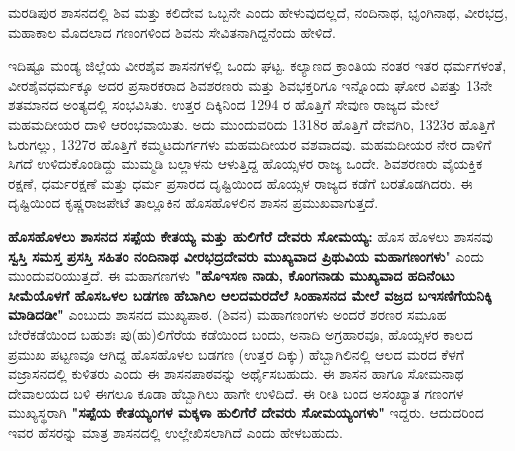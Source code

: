 ಮರಡಿಪುರ ಶಾಸನದಲ್ಲಿ ಶಿವ ಮತ್ತು ಕಲಿದೇವ ಒಬ್ಬನೇ ಎಂದು ಹೇಳುವುದಲ್ಲದೆ, ನಂದಿನಾಥ, ಭೃಂಗಿನಾಥ, ವೀರಭದ್ರ, ಮಹಾಕಾಲ ಮೊದಲಾದ ಗಣಂಗಳಿಂದ ಶಿವನು ಸೇವಿತನಾಗಿದ್ದನೆಂದು ಹೇಳಿದೆ.

ಇದಿಷ್ಟೂ ಮಂಡ್ಯ ಜಿಲ್ಲೆಯ ವೀರಶೈವ ಶಾಸನಗಳಲ್ಲಿ ಒಂದು ಘಟ್ಟ. ಕಲ್ಯಾಣದ ಕ್ರಾಂತಿಯ ನಂತರ ಇತರ ಧರ್ಮಗಳಂತೆ, ವೀರಶೈವಧರ್ಮಕ್ಕೂ ಅದರ ಪ್ರಸಾರಕರಾದ ಶಿವಶರಣರು ಮತ್ತು ಶಿವಭಕ್ತರಿಗೂ ಇನ್ನೊಂದು ಘೋರ ವಿಪತ್ತು 13ನೇ ಶತಮಾನದ ಅಂತ್ಯದಲ್ಲಿ ಸಂಭವಿಸಿತು. ಉತ್ತರ ದಿಕ್ಕಿನಿಂದ 1294 ರ ಹೊತ್ತಿಗೆ ಸೇವುಣ ರಾಜ್ಯದ ಮೇಲೆ ಮಹಮದೀಯರ ದಾಳಿ ಆರಂಭವಾಯಿತು. ಅದು ಮುಂದುವರಿದು 1318ರ ಹೊತ್ತಿಗೆ ದೇವಗಿರಿ, 1323ರ ಹೊತ್ತಿಗೆ ಓರುಗಲ್ಲು, 1327ರ ಹೊತ್ತಿಗೆ ಕಮ್ಮಟದುರ್ಗಗಳು ಮಹಮದೀಯರ ವಶವಾದವು. ಮಹಮದೀಯರ ನೇರ ದಾಳಿಗೆ ಸಿಗದೆ ಉಳಿದುಕೊಂಡಿದ್ದು ಮುಮ್ಮಡಿ ಬಲ್ಲಾಳನು ಆಳುತ್ತಿದ್ದ ಹೊಯ್ಸಳರ ರಾಜ್ಯ ಒಂದೇ. ಶಿವಶರಣರು ವೈಯಕ್ತಿಕ ರಕ್ಷಣೆ, ಧರ್ಮರಕ್ಷಣೆ ಮತ್ತು ಧರ್ಮ ಪ್ರಸಾರದ ದೃಷ್ಟಿಯಿಂದ ಹೊಯ್ಸಳ ರಾಜ್ಯದ ಕಡೆಗೆ ಬರತೊಡಗಿದರು. ಈ ದೃಷ್ಟಿಯಿಂದ ಕೃಷ್ಣರಾಜಪೇಟೆ ತಾಲ್ಲೂಕಿನ ಹೊಸಹೊಳಲಿನ ಶಾಸನ ಪ್ರಮುಖವಾಗುತ್ತದೆ.

\textbf{ಹೊಸಹೊಳಲು ಶಾಸನದ ಸಪ್ಪೆಯ ಕೇತಯ್ಯ ಮತ್ತು ಹುಲಿಗೆರೆ ದೇವರು ಸೋಮಯ್ಯ:} ಹೊಸ ಹೊಳಲು ಶಾಸನವು \textbf{ಸ್ವಸ್ತಿ ಸಮಸ್ತ ಪ್ರಸಸ್ತಿ ಸಹಿತಂ ನಂದಿನಾಥ ವೀರಭದ್ರದೇವರು ಮುಖ್ಯವಾದ ಪ್ರಿಥುವಿಯ ಮಹಾಗಣಂಗಳು}" ಎಂದು ಮುಂದುವರಿಯುತ್ತದೆ. ಈ ಮಹಾಗಣಗಳು \textbf{"ಹೊಇಸಣ ನಾಡು, ಕೊಂಗನಾಡು ಮುಖ್ಯವಾದ ಹದಿನೆಂಟು ಸೀಮೆಯೊಳಗೆ ಹೊಸಒಳಲ ಬಡಗಣ ಹೆಬಾಗಿಲ ಆಲದಮರದೆಲೆ ಸಿಂಹಾಸನದ ಮೇಲೆ ವಜ್ರದ ಬಇಸಣಿಗೆಯನಿಕ್ಕಿ ಮಾಡಿದಡೀ"} ಎಂಬುದು ಶಾಸನದ ಮುಖ್ಯಪಾಠ. (ಶಿವನ) ಮಹಾಗಣಂಗಳು ಅಂದರೆ ಶರಣರ ಸಮೂಹ ಬೇರೆಕಡೆಯಿಂದ ಬಹುಶಃ ಪು(ಹು)ಲಿಗೆರೆಯ ಕಡೆಯಿಂದ ಬಂದು, ಅನಾದಿ ಅಗ್ರಹಾರವೂ, ಹೊಯ್ಸಳರ ಕಾಲದ ಪ್ರಮುಖ ಪಟ್ಟಣವೂ ಆಗಿದ್ದ ಹೊಸಹೊಳಲ ಬಡಗಣ (ಉತ್ತರ ದಿಕ್ಕು) ಹೆಬ್ಬಾಗಿಲಿನಲ್ಲಿ ಆಲದ ಮರದ ಕೆಳಗೆ ವಜ್ರಾಸನದಲ್ಲಿ ಕುಳಿತರು ಎಂದು ಈ ಶಾಸನಪಾಠವನ್ನು ಅರ್ಥೈಸಬಹುದು. ಈ ಶಾಸನ ಹಾಗೂ ಸೋಮನಾಥ ದೇವಾಲಯದ ಬಳಿ ಈಗಲೂ ಕೂಡಾ ಹೆಬ್ಬಾಗಿಲು ಹಾಗೇ ಉಳಿದಿದೆ. ಈ ರೀತಿ ಬಂದ ಅಸಂಖ್ಯಾತ ಗಣಂಗಳ ಮುಖ್ಯಸ್ಥರಾಗಿ \textbf{"ಸಪ್ಪೆಯ ಕೇತಯ್ಯಂಗಳ ಮಕ್ಕಳಾ ಹುಲಿಗೆರೆ ದೇವರು ಸೋಮಯ್ಯಂಗಳು"} ಇದ್ದರು. ಆದುದರಿಂದ ಇವರ ಹೆಸರನ್ನು ಮಾತ್ರ ಶಾಸನದಲ್ಲಿ ಉಲ್ಲೇಖಿಸಲಾಗಿದೆ ಎಂದು ಹೇಳಬಹುದು.

